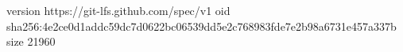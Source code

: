 version https://git-lfs.github.com/spec/v1
oid sha256:4e2ce0d1addc59dc7d0622bc06539dd5e2c768983fde7e2b98a6731e457a337b
size 21960
